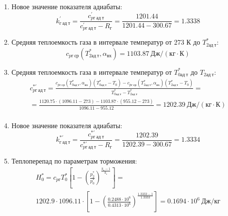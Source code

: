 \documentclass[a4paper,12pt]{article}
\begin{document}
\begin{enumerate}
        \item Новое значение показателя адиабаты:
        \[
            k_{г\ ад\ т}^\prime = \frac{c_{pг\ ад\ т}^\prime}{c_{pг\ ад\ т}^\prime - R_г} =
                \frac{
                    1201.44
                }{
                    1201.44 - 300.67
                }
            = 1.3338
        \]

        \item Средняя теплоемкость газа в интервале температур от 273 К до $T_{2ад\ т}^*$:
        \[
            c_{pг\ ср} (T_{2ад\ т}^*, \alpha_{вх}) =
            1103.87 \ Дж/(кг \cdot К)
        \]

        \item Средняя теплоемкость газа в интервале температур от $T_{0ад\ т}^*$ до $T_{2ад\ т}$:
        \begin{gather*}
            c_{pг\ ад\ т}^{*\prime} = \frac{
		        c_{pг\ ср}(T_{0ад\ т}^*, \alpha_{вх}) (T_{0ад\ т}^* - T_0) - c_{pг\ ср}(T_{2ад\ т}^*, \alpha_{вх}) (T_{2ад\ т}^* - T_0)
		    }{
		        T_{0ад\ т}^* - T_{2ад\ т}^*} =\\
            =\frac{
		        1120.75 \cdot
                (1096.11 - 273) -
		        1103.87 \cdot
                (955.12 - 273)
		    }{
		        1096.11 - 955.12} =
		    1202.39 \ Дж / (кг \cdot К)\\
        \end{gather*}

        \item Новое значение показателя адиабаты:
        \[
            k_{г\ ад\ т}^{*\prime} = \frac{c_{pг\ ад\ т}^{*\prime}}{c_{pг\ ад\ т}^{*\prime} - R_г} =
                \frac{
                    1202.39
                }{
                    1202.39 - 300.67
                }
            = 1.3334
        \]

        \item Теплоперепад по параметрам торможения:
        \begin{gather*}
            H_0^* = c_{pг} T_0^* \left[
                        1 - \left(
                                \frac{p_2^*}{p_0^*}
                            \right) ^
                        \frac{k_г - 1}{k_г}
                    \right] =\\
            1202.9 \cdot 1096.11 \cdot
                    \left[
                        1 - \left(
                                \frac{
                                    0.2488 \cdot 10^6
                                }{
                                    0.4313 \cdot 10^6
                                }
                            \right) ^
                        \frac{1.3333 - 1}{1.3333}
                    \right]
            = 0.1694 \cdot 10^6 \ Дж/кг\\
        \end{gather*}


\end{enumerate}
\end{document}
